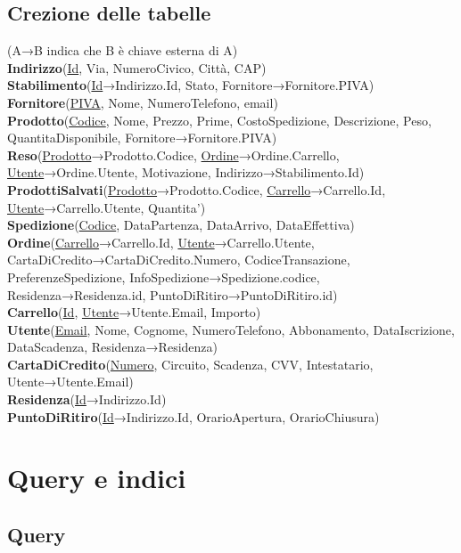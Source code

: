 \documentclass[11pt]{article}
\begin{document}
\subsection{Crezione delle tabelle} 

(A→B indica che B è chiave esterna di A)\\
\textbf{Indirizzo}(\underline{Id}, Via, NumeroCivico, Città, CAP)\\
\textbf{Stabilimento}(\underline{Id}→Indirizzo.Id, Stato, Fornitore→Fornitore.PIVA)\\
\textbf{Fornitore}(\underline{PIVA}, Nome, NumeroTelefono, email)\\
\textbf{Prodotto}(\underline{Codice}, Nome, Prezzo, Prime, CostoSpedizione, Descrizione, Peso, QuantitaDisponibile, Fornitore→Fornitore.PIVA)\\
\textbf{Reso}(\underline{Prodotto}→Prodotto.Codice, \underline{Ordine}→Ordine.Carrello, \underline{Utente}→Ordine.Utente, Motivazione, Indirizzo→Stabilimento.Id)\\
\textbf{ProdottiSalvati}(\underline{Prodotto}→Prodotto.Codice, \underline{Carrello}→Carrello.Id, \underline{Utente}→Carrello.Utente, Quantita')\\
\textbf{Spedizione}(\underline{Codice}, DataPartenza, DataArrivo, DataEffettiva)\\
\textbf{Ordine}(\underline{Carrello}→Carrello.Id, \underline{Utente}→Carrello.Utente, CartaDiCredito→CartaDiCredito.Numero, CodiceTransazione, PreferenzeSpedizione, InfoSpedizione→Spedizione.codice, Residenza→Residenza.id, PuntoDiRitiro→PuntoDiRitiro.id)\\
\textbf{Carrello}(\underline{Id}, \underline{Utente}→Utente.Email, Importo)\\
\textbf{Utente}(\underline{Email}, Nome, Cognome, NumeroTelefono, Abbonamento, DataIscrizione, DataScadenza, Residenza→Residenza)\\
\textbf{CartaDiCredito}(\underline{Numero}, Circuito, Scadenza, CVV, Intestatario, Utente→Utente.Email)\\
\textbf{Residenza}(\underline{Id}→Indirizzo.Id)\\
\textbf{PuntoDiRitiro}(\underline{Id}→Indirizzo.Id, OrarioApertura, OrarioChiusura)

\section{Query e indici}

\subsection{Query}
\end{document}
